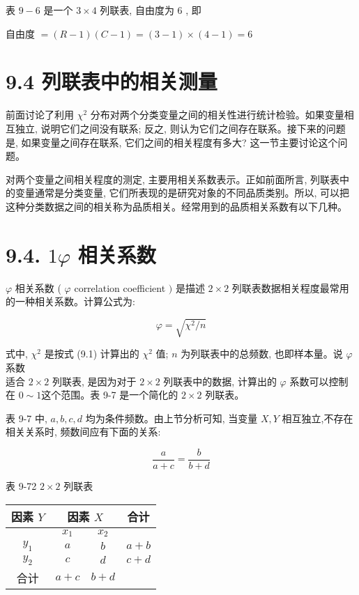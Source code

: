 \documentclass[10pt]{article}
\begin{document}
\begin{CJK*}{UTF8}{bsmi}
表 $9-6$ 是一个 $3 \times 4$ 列联表, 自由度为 6 , 即

自由度 $=(R-1)(C-1)=(3-1) \times(4-1)=6$

\section*{9.4 列联表中的相关测量}
前面讨论了利用 $\chi^{2}$ 分布对两个分类变量之间的相关性进行统计检验。如果变量相互独立, 说明它们之间没有联系; 反之, 则认为它们之间存在联系。接下来的问题是, 如果变量之间存在联系, 它们之间的相关程度有多大? 这一节主要讨论这个问题。

对两个变量之间相关程度的测定, 主要用相关系数表示。正如前面所言, 列联表中的变量通常是分类变量, 它们所表现的是研究对象的不同品质类别。所以, 可以把这种分类数据之间的相关称为品质相关。经常用到的品质相关系数有以下几种。

\section*{9.4. $1 \varphi$ 相关系数}
$\varphi$ 相关系数 ( $\varphi$ correlation coefficient $)$ 是描述 $2 \times 2$ 列联表数据相关程度最常用的一种相关系数。计算公式为:


\begin{equation*}
\varphi=\sqrt{\chi^{2} / n} \tag{9.3}
\end{equation*}


式中, $\chi^{2}$ 是按式 (9.1) 计算出的 $\chi^{2}$ 值; $n$ 为列联表中的总频数, 也即样本量。说 $\varphi$ 系数\\
适合 $2 \times 2$ 列联表, 是因为对于 $2 \times 2$ 列联表中的数据, 计算出的 $\varphi$ 系数可以控制在 $0 \sim 1$这个范围。表 9-7 是一个简化的 $2 \times 2$ 列联表。

表 9-7 中, $a, b, c, d$ 均为条件频数。由上节分析可知, 当变量 $X, Y$ 相互独立,不存在相关关系时, 频数间应有下面的关系:

$$
\frac{a}{a+c}=\frac{b}{b+d}
$$

表 9-72 $2 \times 2$ 列联表

\begin{center}
\begin{tabular}{|c|c|c|c|}
\hline
\multirow{2}{*}{因素 $Y$} & \multicolumn{2}{|c|}{因素 $X$} & \multirow{2}{*}{合计} \\
\hline
 & $x_{1}$ & $x_{2}$ &  \\
\hline
$y_{1}$ & $a$ & $b$ & $a+b$ \\
\hline
$y_{2}$ & $c$ & $d$ & $c+d$ \\
\hline
合计 & $a+c$ & $b+d$ &  \\
\hline
\end{tabular}
\end{center}


\end{CJK*}
\end{document}
